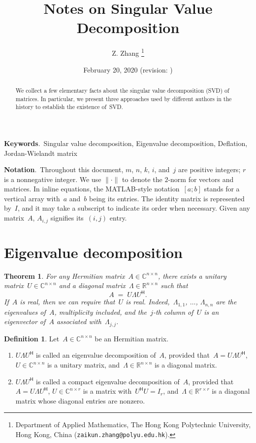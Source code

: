 \documentclass[11pt,a4paper]{article}  %
\title{Notes on Singular Value Decomposition}
\date{February 20, 2020 (revision: \DTMnow)}
\author{
Z. Zhang
\thanks{
Department of Applied Mathematics, The Hong Kong Polytechnic University,
Hong Kong, China ({\tt zaikun.zhang@polyu.edu.hk}).
}
}
\numberwithin{equation}{section}
\newtheorem{theorem}{Theorem}%
\theoremstyle{definition}
\newtheorem{definition}{Definition}%
\def\RR{\mathbb{R}}
\def\CC{\mathbb{C}}
\newcommand{\hmt}{{\scriptscriptstyle{{\mathsf{H}}}}}
\begin{document}
\maketitle

\begin{abstract}
  We collect a few elementary facts about the singular value decomposition (SVD) of matrices. In
  particular, we present three approaches used by different authors in the history
  to establish the existence of~SVD.
\end{abstract}

\textbf{Keywords}.~Singular value decomposition, Eigenvalue decomposition, Deflation,
Jordan-Wielandt matrix

\textbf{Notation}.~Throughout this document, $m$, $n$, $k$, $i$, and~$j$ are positive integers; $r$ is a nonnegative integer.
We use $\|\cdot\|$ to denote the $2$-norm for vectors and matrices.
In inline equations, the MATLAB-style notation~$[a; b]$ stands for a vertical array
with~$a$ and~$b$ being its entries. The identity matrix is represented by~$I$, and it may take
a subscript to indicate its order when necessary. Given any matrix~$A$, $A_{i,j}$ signifies its~$(i,j)$ entry.


\section{Eigenvalue decomposition}

\begin{theorem}
  \label{th:evd}
  For any Hermitian matrix~$A\in \CC^{n\times n}$, there exists a unitary matrix~$U\in
  \CC^{n\times n}$ and a diagonal matrix~$\Lambda \in \RR^{n\times n}$ such that
  \begin{equation*}
    A \; = \; U\Lambda U^\hmt.
  \end{equation*}
  If~$A$ is real, then we can require that~$U$ is real.
  Indeed,~$\Lambda_{1,1}$, $\dots$, $\Lambda_{n,n}$ are the eigenvalues of~$A$, multiplicity
  included, and the~$j$-th column of~$U$ is an eigenvector of~$A$ associated with~$\Lambda_{j,j}$.
\end{theorem}

\begin{definition}
  \label{def:evd}
  Let~$A\in \CC^{n\times n}$ be an Hermitian matrix.
  \begin{enumerate}[leftmargin=1.5em]
    \item
      $U\Lambda U^\hmt$ is called an eigenvalue decomposition of~$A$, provided that~$A = U \Lambda U^\hmt$, $U
      \in \CC^{n\times n}$ is a unitary matrix, and~$\Lambda \in \RR^{n\times n}$ is a diagonal
      matrix.
    \item
      $U\Lambda U^\hmt$ is called a compact eigenvalue decomposition of~$A$,
      provided that~$A = U \Lambda U^\hmt$, $U \in \CC^{n\times r}$ is a matrix with~$U^\hmt U = I_r$,
      and~$\Lambda \in \RR^{r\times r}$ is a diagonal matrix whose diagonal entries are nonzero.
  \end{enumerate}
\end{definition}
\end{document}
